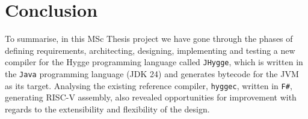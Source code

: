 \chapter{Conclusion}

To summarise, in this MSc Thesis project we have gone through the phases of defining requirements, architecting, designing, implementing
and testing a new compiler for the Hygge programming language called \texttt{JHygge}, which is written in the \texttt{Java} programming
language (JDK 24) and generates bytecode for the JVM as its target. Analysing the existing reference compiler, \texttt{hyggec}, written in
\texttt{F\#}, generating RISC-V assembly, also revealed opportunities for improvement with regards to the extensibility and flexibility
of the design.

